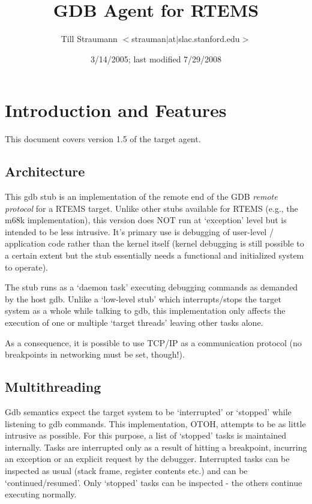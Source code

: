 \documentclass{article}
\title{GDB Agent for RTEMS}
\author{Till Straumann $<$strauman$|$at$|$slac.stanford.edu$>$}
\date{3/14/2005; last modified 7/29/2008\\
\nix
}
\begin{document}
\maketitle
\tableofcontents

\section{Introduction and Features}

This document covers version 1.5 of the target agent.

\subsection{Architecture}

This gdb stub is an implementation of the remote end of the
GDB {\em remote protocol} for a RTEMS target. Unlike other stubs
available for RTEMS (e.g., the m68k implementation), this
version does NOT run at `exception' level but is intended to
be less intrusive. It's primary use is debugging of user-level
/ application code rather than the kernel itself (kernel
debugging is still possible to a certain extent but the stub
essentially needs a functional and initialized system to
operate).

The stub runs as a `daemon task' executing debugging commands
as demanded by the host gdb. Unlike a `low-level stub' which
interrupts/stops the target system as a whole while talking
to gdb, this implementation only affects the execution of
one or multiple `target threads' leaving other tasks alone.

As a consequence, it is possible to use TCP/IP as a communication
protocol (no breakpoints in networking must be set, though!).

\subsection{Multithreading}
Gdb semantics expect the target system to be `interrupted' or
`stopped' while listening to gdb commands. This implementation,
OTOH, attempts to be as little intrusive as possible. For this
purpose, a list of `stopped' tasks is maintained internally.
Tasks are interrupted only as a result of hitting a breakpoint,
incurring an exception or an explicit request by the debugger.
Interrupted tasks can be inspected as usual (stack frame,
register contents etc.) and can be `continued/resumed'.
Only `stopped' tasks can be inspected - the others continue
executing normally.
\end{document}
